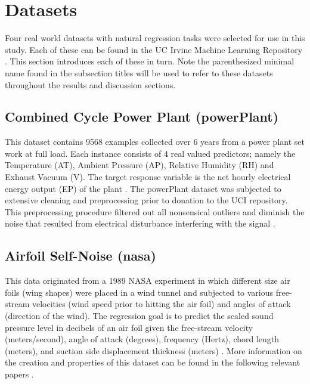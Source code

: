 \documentclass[9pt, conference]{IEEEtran}
\begin{document}
\section{Datasets}
\label{sec:datasets}
Four real world datasets with natural regression tasks were selected for use in this study. Each of these can be found in the UC Irvine Machine Learning Repository \cite{Lichman:2013}. This section introduces each of these in turn. Note the parenthesized minimal name found in the subsection titles will be used to refer to these datasets throughout the results and discussion sections.

\subsection{Combined Cycle Power Plant (powerPlant)}
This dataset contains 9568 examples collected over 6 years from a power plant set work at full load. Each instance consists of 4 real valued predictors; namely the  Temperature (AT), Ambient Pressure (AP), Relative Humidity (RH) and Exhaust Vacuum (V). The target response variable is the net hourly electrical energy output (EP) of the plant \cite{powerPlantDataset}. The powerPlant dataset was subjected to extensive cleaning and preprocessing prior to donation to the UCI repository. This preprocessing procedure filtered out all nonsensical outliers and diminish the noise that resulted from electrical disturbance interfering with the signal \cite{powerPlantCiteRequest1} \cite{powerPlantCiteRequest2}.

\subsection{Airfoil Self-Noise (nasa)}
This data originated from a 1989 NASA experiment in which different size air foils (wing shapes) were placed in a wind tunnel and subjected to various free-stream velocities (wind speed prior to hitting the air foil) and angles of attack (direction of the wind). The regression goal is to predict the scaled sound pressure level in decibels of an air foil given the free-stream velocity (meters/second), angle of attack (degrees), frequency (Hertz), chord length (meters), and suction side displacement thickness (meters) \cite{airFoilDataset}. More information on the creation and properties of this dataset can be found in the following relevant papers \cite{nasaCiteRequest1} \cite{nasaCiteRequest2} \cite{nasaCiteRequest3}.
\end{document}

